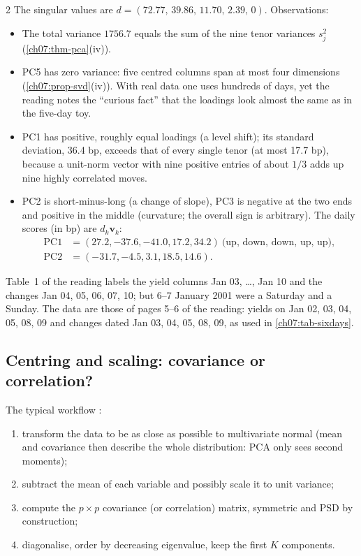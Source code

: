 \begin{paracol}{2}
The singular values are $d=(72.77,\,39.86,\,11.70,\,2.39,\,0)$. Observations:
\begin{itemize}
  \item The total variance $1756.7$ equals the sum of the nine tenor variances $s_j^2$ (\cref{ch07:thm-pca}(iv)).
  \item PC5 has zero variance: five centred columns span at most four dimensions
        (\cref{ch07:prop-svd}(iv)). With real data one uses hundreds of days, yet the reading notes the
        ``curious fact'' that the loadings look almost the same as in the five-day toy.
  \item PC1 has positive, roughly equal loadings (a level shift); its standard deviation, 36.4 bp, exceeds
        that of every single tenor (at most 17.7 bp), because a unit-norm vector with nine positive entries
        of about $1/3$ adds up nine highly correlated moves.
  \item PC2 is short-minus-long (a change of slope), PC3 is negative at the two ends and positive in the
        middle (curvature; the overall sign is arbitrary). The daily scores (in bp) are $d_k\bm v_k$:
        \begin{align*}
          \text{PC1}&=(27.2,-37.6,-41.0,17.2,34.2)\ \text{(up, down, down, up, up)},\\
          \text{PC2}&=(-31.7,-4.5,3.1,18.5,14.6).
        \end{align*}
\end{itemize}

\begin{coursenote}
Table~1 of the reading labels the yield columns Jan 03, \dots, Jan 10 and the changes Jan 04, 05, 06, 07, 10;
but 6--7 January 2001 were a Saturday and a Sunday. The data are those of pages 5--6 of the reading: yields on
Jan 02, 03, 04, 05, 08, 09 and changes dated Jan 03, 04, 05, 08, 09, as used in \cref{ch07:tab-sixdays}.
\end{coursenote}

\subsection{Centring and scaling: covariance or correlation?}\label{ch07:sec-corr}
The typical workflow :
\begin{enumerate}[1.]
  \item transform the data to be as close as possible to multivariate
      normal (mean and covariance then describe the whole distribution: PCA only sees second moments);
  \item subtract the mean of each variable and possibly scale it to unit variance;
  \item compute the $p\times p$
      covariance (or correlation) matrix, symmetric and PSD by construction;
  \item diagonalise, order by decreasing
      eigenvalue, keep the first $K$ components.
\end{enumerate}


\end{paracol}
